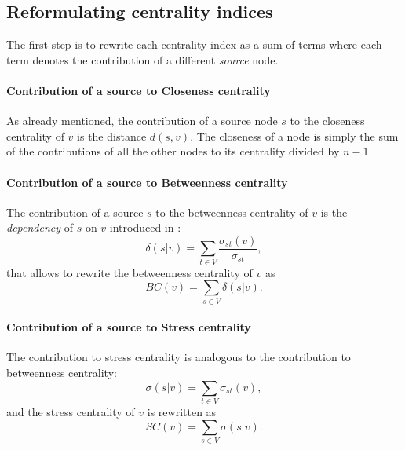 \subsection{Reformulating centrality indices}


The first step is to rewrite each centrality index as a sum of terms where each term denotes the contribution of a different \emph{source} node.

\paragraph{Contribution of a source to Closeness centrality}
As already mentioned, the contribution of a source node $s$ to the closeness centrality of $v$ is the distance $d(s,v)$. The closeness of a node is simply the sum of the contributions of all the other nodes to its centrality divided by $n-1$.

\paragraph{Contribution of a source to Betweenness centrality}
The contribution of a source $s$ to the betweenness centrality of $v$ is the \emph{dependency} of $s$ on $v$ introduced in \cite{brandes2001}:
\begin{equation}
\delta(s|v) = \sum_{t \in V} \frac{\sigma_{st}(v)}{\sigma_{st}},
\end{equation}
that allows to rewrite the betweenness centrality of $v$ as
\begin{equation}
BC(v) = \sum_{s \in V} \delta(s|v).
\end{equation}

\paragraph{Contribution of a source to Stress centrality}
The contribution to stress centrality is analogous to the contribution to betweenness centrality:
\begin{equation} \label{eq:contrib:sc}
\sigma(s|v) = \sum_{t \in V} \sigma_{st}(v),
\end{equation}
and the stress centrality of $v$ is rewritten as
\begin{equation}
SC(v) = \sum_{s \in V} \sigma(s|v).
\end{equation}

